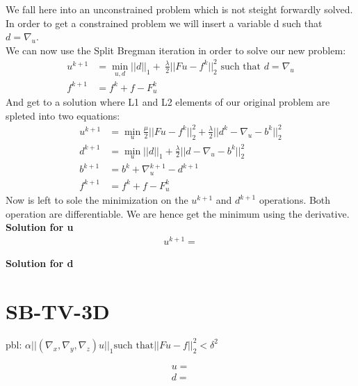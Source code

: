 	We fall here into an unconstrained problem which is not steight forwardly solved. In order to get a constrained problem we will insert a variable d such that $d = \nabla_u$.\\
	We can now use the Split Bregman iteration in order to solve our new problem: 
     \begin{equation}
        \begin{aligned}
            u^{k+1} &= \min_{u,d}||d||_1 + \ \frac{\lambda}{2}||Fu - f^k||_2^2 \mbox{ such that } d = \nabla_u\\
            f^{k+1} &= f^k + f - F_u^k
        \end{aligned}
    \end{equation}
	And get to a solution where L1 and L2 elements of our original problem are spleted into two equations:
    \begin{equation}
        \begin{aligned}
            u^{k+1} &= \min_{u} \frac{\mu}{2}||Fu - f^k||_2^2 + \frac{\lambda}{2} ||d^k - \nabla_u - b^k||_2^2\\
            d^{k+1} &= \min_{u} ||d||_1 + \frac{\lambda}{2}||d - \nabla_u-b^k||_2^2\\
            b^{k+1} &= b^k +\nabla_u^{k+1} - d^{k+1}\\
            f^{k+1} &= f^k + f - F_u^k
        \end{aligned}
    \end{equation}
    Now is left to sole the minimization on the $u^{k+1}$ and $d^{k+1}$ operations. Both operation are differentiable. We are hence get the minimum using the derivative.\\
\textbf{Solution for u}\\
\begin{equation}
	\begin{aligned}
		u^{k+1} = 
	\end{aligned}
\end{equation}

\textbf{Solution for d}\\
    
    
    
\section{SB-TV-3D}
    pbl: $\alpha ||(\nabla_x,\nabla_y, \nabla_z)u||_1 \mbox{such that} ||Fu - f||_2^2 < \delta^2$
    
    \begin{equation}
        \begin{aligned}
            u =\\
            d =
        \end{aligned}
    \end{equation}